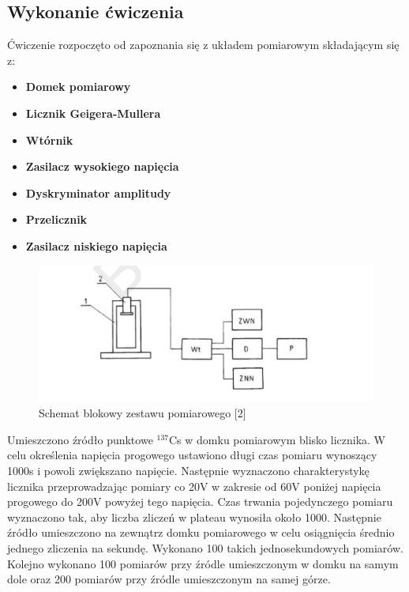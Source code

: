 \documentclass{article}
\begin{document}
\subsection{Wykonanie ćwiczenia}
Ćwiczenie rozpoczęto od zapoznania się z układem pomiarowym składającym się z:
\begin{itemize}
	\item \textbf{Domek pomiarowy}
	\item \textbf{Licznik Geigera-Mullera}
	\item \textbf{Wtórnik}
	\item \textbf{Zasilacz wysokiego napięcia}
	\item \textbf{Dyskryminator amplitudy}
	\item \textbf{Przelicznik}
	\item \textbf{Zasilacz niskiego napięcia}
\end{itemize}
\begin{figure}[h!]
	\centering
	\includegraphics[width = 0.7\linewidth]{images/uklad}
	\caption{Schemat blokowy zestawu pomiarowego [2]}
\end{figure}
Umieszczono źródło punktowe $^{137}$Cs w domku pomiarowym blisko licznika. W celu określenia napięcia progowego ustawiono długi czas pomiaru wynoszący 1000s i powoli zwiększano napięcie. Następnie wyznaczono charakterystykę licznika przeprowadzając pomiary co 20V w zakresie od 60V poniżej napięcia progowego do 200V powyżej tego napięcia. Czas trwania pojedynczego pomiaru wyznaczono tak, aby liczba zliczeń w plateau wynosiła około 1000. Następnie źródło umieszczono na zewnątrz domku pomiarowego w celu osiągnięcia średnio jednego zliczenia na sekundę. Wykonano 100 takich jednosekundowych pomiarów. Kolejno wykonano 100 pomiarów przy źródle umieszczonym w domku na samym dole oraz 200 pomiarów przy źródle umieszczonym na samej górze.
\newpage
\end{document}
